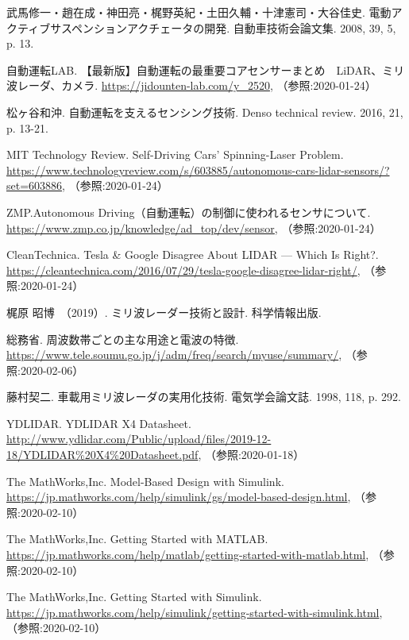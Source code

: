 {\small
\begin{thebibliography}{9}
   武馬修一・趙在成・神田亮・梶野英紀・土田久輔・十津憲司・大谷佳史. 電動アクティブサスペンションアクチェータの開発. 自動車技術会論文集. 2008, 39, 5, p. 13.

   自動運転LAB. 【最新版】自動運転の最重要コアセンサーまとめ　LiDAR、ミリ波レーダ、カメラ. \url{https://jidounten-lab.com/y_2520}, （参照:2020-01-24）

   松ヶ谷和沖. 自動運転を支えるセンシング技術. Denso technical review. 2016, 21, p. 13-21.

   MIT Technology Review. Self-Driving Cars’ Spinning-Laser Problem. \url{https://www.technologyreview.com/s/603885/autonomous-cars-lidar-sensors/?set=603886}, （参照:2020-01-24）

   ZMP.Autonomous Driving（自動運転）の制御に使われるセンサについて. \url{https://www.zmp.co.jp/knowledge/ad_top/dev/sensor}, （参照:2020-01-24）

   CleanTechnica. Tesla \& Google Disagree About LIDAR — Which Is Right?. \url{https://cleantechnica.com/2016/07/29/tesla-google-disagree-lidar-right/}, （参照:2020-01-24）

  梶原 昭博　（2019）. ミリ波レーダー技術と設計. 科学情報出版.

   総務省. 周波数帯ごとの主な用途と電波の特徴. \url{https://www.tele.soumu.go.jp/j/adm/freq/search/myuse/summary/}, （参照:2020-02-06）

   藤村契二. 車載用ミリ波レーダの実用化技術. 電気学会論文誌. 1998, 118, p. 292.

   YDLIDAR. YDLIDAR X4 Datasheet. \url{http://www.ydlidar.com/Public/upload/files/2019-12-18/YDLIDAR%20X4%20Datasheet.pdf}, （参照:2020-01-18）

   The MathWorks,Inc. Model-Based Design with Simulink. \url{https://jp.mathworks.com/help/simulink/gs/model-based-design.html}, （参照:2020-02-10）

   The MathWorks,Inc. Getting Started with MATLAB. \url{https://jp.mathworks.com/help/matlab/getting-started-with-matlab.html}, （参照:2020-02-10）

   The MathWorks,Inc. Getting Started with Simulink. \url{https://jp.mathworks.com/help/simulink/getting-started-with-simulink.html}, （参照:2020-02-10）

\end{thebibliography}
}
